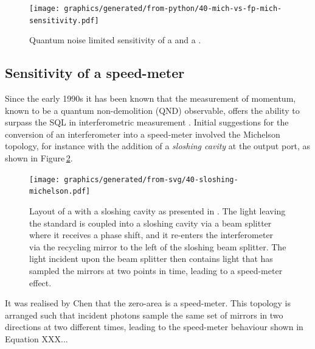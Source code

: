 \begin{figure}
  \centering
  \texttt{[image: graphics/generated/from-python/40-mich-vs-fp-mich-sensitivity.pdf]}
  \caption[Quantum noise limited sensitivity of a Michelson and Fabry-Perot Michelson]{\label{fig:mich-vs-fp-mich-sensitivity}Quantum noise limited sensitivity of a \MI{} and a \FPMI{}.}
\end{figure}

\subsection{\label{sec:speed-meter-measurement}Sensitivity of a speed-meter}
Since the early 1990s it has been known that the measurement of momentum, known to be a quantum non-demolition (\gls{QND}) observable, offers the ability to surpass the \gls{SQL} in interferometric measurement \cite{Braginsky1990}. Initial suggestions for the conversion of an interferometer into a speed-meter involved the Michelson topology, for instance with the addition of a \emph{sloshing cavity} \cite{Braginsky2000, Purdue2002} at the output port, as shown in Figure\,\ref{fig:sloshing-michelson}.

\begin{figure}
  \centering
  \texttt{[image: graphics/generated/from-svg/40-sloshing-michelson.pdf]}
  \caption[Layout of a \MI{} with a sloshing cavity]{\label{fig:sloshing-michelson}Layout of a \MI{} with a sloshing cavity as presented in \cite{Purdue2002}. The light leaving the standard \MI{} is coupled into a sloshing cavity via a beam splitter where it receives a phase shift, and it re-enters the interferometer via the recycling mirror to the left of the sloshing beam splitter. The light incident upon the beam splitter then contains light that has sampled the mirrors at two points in time, leading to a speed-meter effect.}
\end{figure}

It was realised by Chen \cite{Chen2003} that the zero-area \SSM{} is a speed-meter. This topology is arranged such that incident photons sample the same set of mirrors in two directions at two different times, leading to the speed-meter behaviour shown in Equation XXX...

